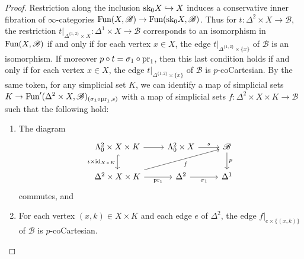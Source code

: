 \documentclass{tac}
\newcommand{\s}[1]{\mathscr{#1}}
\newcommand{\tx}[1]{\textnormal{#1}}
\begin{document}
\begin{proof} Restriction along the inclusion $\tx{sk}_0 X \hookrightarrow X$ induces a conservative inner fibration of $\infty$-categories $\tx{Fun}(X,\s{B}) \to \tx{Fun}(\tx{sk}_0 X,\s{B})$.  Thus for $t : \Delta^2 \times X \to \s{B}$, the restriction $t |_{\Delta^{\{1,2 \}} \times X} : \Delta^1 \times X \to \s{B}$ corresponds to an isomorphism in $\tx{Fun}(X,\s{B})$ if and only if for each vertex $x\in X$, the edge $t|_{\Delta^{\{1,2 \}} \times \{x\}}$ of $\s{B}$ is an isomorphism.  If moreover $p\circ t = \sigma_1 \circ \tx{pr}_1$, then this last condition holds if and only if for each vertex $x\in X$, the edge $t|_{\Delta^{\{1,2 \}} \times \{x\}}$ of $\s{B}$ is $p$-coCartesian.  By the same token, for any simplicial set $K$, we can identify a map of simplicial sets $K \to \tx{Fun}' (\Delta^2 \times X,\s{B})_{(\sigma_1 \circ \tx{pr}_1 , s)}$ with a map of simplicial sets $f : \Delta^2 \times X \times K \to \s{B}$ such that the following hold:
\begin{enumerate}[label=(\roman*)]
\item\label{cocartnzippinglemi} The diagram
\[\begin{tikzcd}
\Lambda^2_0 \times X \times K \arrow[]{r} \arrow[hook]{d}[swap]{\iota\times \tx{id}_{X\times K}} & \Lambda^2_0 \times X \arrow[]{r}{s} & \s{B}\arrow[]{d}{p}\\
\Delta^2 \times X \times K \arrow[]{r}[swap]{\tx{pr}_1} \arrow[]{urr}[swap]{f} & \Delta^2  \arrow[]{r}[swap]{\sigma_1}& \Delta^1
\end{tikzcd}\]
commutes, and
\item\label{cocartnzippinglemii} For each vertex $(x,k) \in X\times K$ and each edge $e$ of $\Delta^2$, the edge $f|_{e\times \{(x,k) \}}$ of $\s{B}$ is $p$-coCartesian.
\end{enumerate}


\end{proof}
\end{document}
